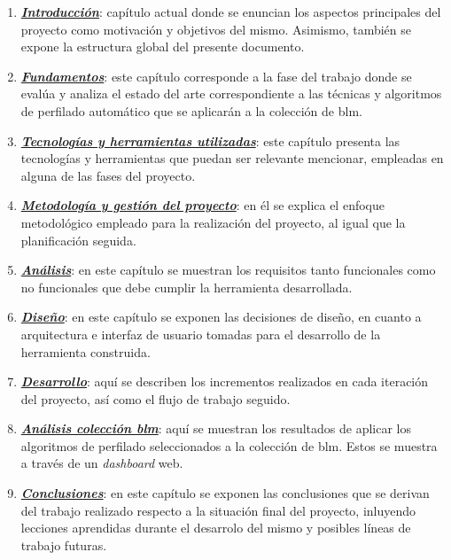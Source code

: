 \begin{enumerate}

    \item \hyperref[chap:introduccion]{\textit{\textbf{Introducción}}}: capítulo actual donde se enuncian los aspectos principales del proyecto como motivación y objetivos del mismo. Asimismo, también se expone la estructura global del presente documento.
    
    \item \hyperref[chap:fundamentos]{\textit{\textbf{Fundamentos}}}: este capítulo corresponde a la fase del trabajo donde se evalúa y analiza el estado del arte correspondiente a las técnicas y algoritmos de perfilado automático que se aplicarán a la colección de \acrshort{blm}.
    
    \item \hyperref[chap:tecnologias]{\textit{\textbf{Tecnologías y herramientas utilizadas}}}: este capítulo presenta las tecnologías y herramientas que puedan ser relevante mencionar, empleadas en alguna de las fases del proyecto.
    
    \item \hyperref[chap:metodologia]{\textit{\textbf{Metodología y gestión del proyecto}}}: en él se explica el enfoque metodológico empleado para la realización del proyecto, al igual que la planificación seguida.

    \item \hyperref[chap:analisis]{\textit{\textbf{Análisis}}}: en este capítulo se muestran los requisitos tanto funcionales como no funcionales que debe cumplir la herramienta desarrollada.
    
    \item \hyperref[chap:design]{\textit{\textbf{Diseño}}}: en este capítulo se exponen las decisiones de diseño, en cuanto a arquitectura e interfaz de usuario tomadas para el desarrollo de la herramienta construida.
    
    \item \hyperref[chap:desarrollo]{\textit{\textbf{Desarrollo}}}: aquí se describen los incrementos realizados en cada iteración del proyecto, así como el flujo de trabajo seguido.

    \item \hyperref[chap:blm]{\textit{\textbf{Análisis colección \acrshort{blm}}}}: aquí se muestran los resultados de aplicar los algoritmos de perfilado seleccionados a la colección de \acrshort{blm}. Estos se muestra a través de un \textit{dashboard} web.

    \item \hyperref[chap:conclusiones]{\textit{\textbf{Conclusiones}}}: en este capítulo se exponen las conclusiones que se derivan del trabajo realizado respecto a la situación final del proyecto, inluyendo lecciones aprendidas durante el desarrolo del mismo y posibles líneas de trabajo futuras.
    
\end{enumerate}